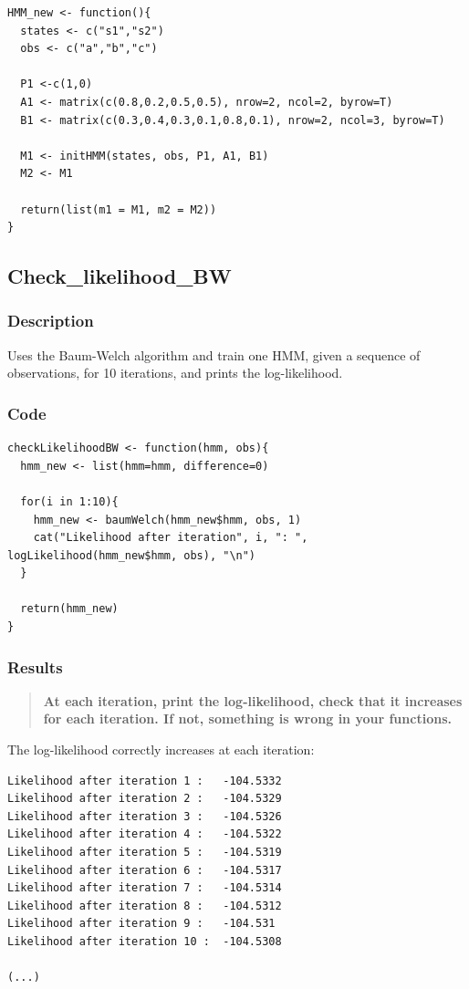 \documentclass[a4paper]{article}
\begin{document}
\begin{lstlisting}
HMM_new <- function(){
  states <- c("s1","s2")
  obs <- c("a","b","c")
  
  P1 <-c(1,0)
  A1 <- matrix(c(0.8,0.2,0.5,0.5), nrow=2, ncol=2, byrow=T)
  B1 <- matrix(c(0.3,0.4,0.3,0.1,0.8,0.1), nrow=2, ncol=3, byrow=T)
  
  M1 <- initHMM(states, obs, P1, A1, B1)
  M2 <- M1
  
  return(list(m1 = M1, m2 = M2))
}
\end{lstlisting}

\subsection{Check\_likelihood\_BW}

\subsubsection{Description}

Uses the Baum-Welch algorithm and train one HMM, given a sequence of observations, for 10 iterations, and prints the log-likelihood.

\subsubsection{Code}

\begin{lstlisting}
checkLikelihoodBW <- function(hmm, obs){
  hmm_new <- list(hmm=hmm, difference=0)
  
  for(i in 1:10){
    hmm_new <- baumWelch(hmm_new$hmm, obs, 1)
    cat("Likelihood after iteration", i, ": ", logLikelihood(hmm_new$hmm, obs), "\n")
  }
  
  return(hmm_new)
}
\end{lstlisting}

\subsubsection{Results}

\begin{quotation}
\textbf{At each iteration, print the log-likelihood, check that it increases for each iteration. If not, something is wrong in your functions.}
\end{quotation}

The log-likelihood correctly increases at each iteration:

\begin{lstlisting}
Likelihood after iteration 1 :   -104.5332 
Likelihood after iteration 2 :   -104.5329 
Likelihood after iteration 3 :   -104.5326 
Likelihood after iteration 4 :   -104.5322 
Likelihood after iteration 5 :   -104.5319 
Likelihood after iteration 6 :   -104.5317 
Likelihood after iteration 7 :   -104.5314 
Likelihood after iteration 8 :   -104.5312 
Likelihood after iteration 9 :   -104.531 
Likelihood after iteration 10 :  -104.5308 

(...)
\end{lstlisting}
\end{document}
